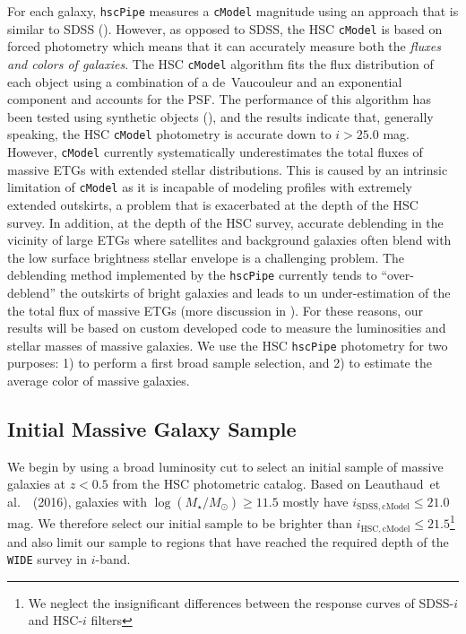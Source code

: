 \documentclass[a4paper,fleqn,usenatbib]{mnras}
\def\etal{{\ et al.~}}
\def\cmodel{\texttt{cModel}}
\def\logms{{$\log (M_{\star}/M_{\odot})$}}
\begin{document}
    For each galaxy, \texttt{hscPipe} measures a \cmodel{} magnitude using an approach 
    that is similar to SDSS (\citealt{BoschInPrep}). 
    However, as opposed to SDSS, the HSC \cmodel{} is based on forced photometry which 
    means that it can accurately measure both the \textit{fluxes and colors of galaxies}. 
    The HSC \cmodel{} algorithm fits the flux distribution of each object using a 
    combination of a de~Vaucouleur and an exponential component and accounts for the PSF. 
    The performance of this algorithm has been tested using synthetic objects 
    (\citealt{SynPipeInPrep}), and the results indicate that, generally speaking, 
    the HSC \cmodel{} photometry is accurate down to $i >25.0$ mag.  
    However, \cmodel{} currently systematically underestimates the total fluxes of 
    massive ETGs with extended stellar distributions. 
    This is caused by an intrinsic limitation of \cmodel{} as it is incapable of
    modeling profiles with extremely extended outskirts, a problem that is exacerbated 
    at the depth of the HSC survey. 
    In addition, at the depth of the HSC survey, accurate deblending in the vicinity of
    large ETGs where satellites and background galaxies often blend with the low surface 
    brightness stellar envelope is a challenging problem. 
    The deblending method implemented by the \texttt{hscPipe} currently tends to 
    ``over-deblend'' the outskirts of bright galaxies and leads to un 
    under-estimation of the the total flux of massive ETGs (more discussion in 
    \citealt{BoschInPrep}).  
    For these reasons, our results will be based on custom developed code to measure 
    the luminosities and stellar masses of massive galaxies. 
    We use the HSC \texttt{hscPipe} photometry for two purposes: 
    1) to perform a first broad sample selection, and 2) to estimate the average 
    color of massive galaxies.
    
\subsection{Initial Massive Galaxy Sample}
    \label{ssec:initial}
    
    We begin by using a broad luminosity cut to select an initial sample of massive 
    galaxies at $z < 0.5$ from the HSC photometric catalog. 
    Based on Leauthaud\etal~(2016), galaxies with \logms{}$\geq 11.5$ mostly have 
    $i_{\mathrm{SDSS, cModel}} \leq 21.0$ mag. 
    We therefore select our initial sample to be brighter than 
    $i_{\mathrm{HSC, cModel}} \leq 21.5$\footnote{We neglect the insignificant 
    differences between the response curves of SDSS-$i$ and HSC-$i$ filters} 
    and also limit our sample to regions that have reached the required depth of 
    the \texttt{WIDE} survey in $i$-band.
    
\end{document}

